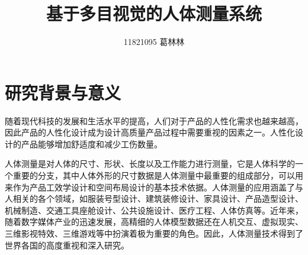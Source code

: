 \documentclass[10pt]{article}
\title{基于多目视觉的人体测量系统}
\author{11821095 葛林林}
\begin{document}
\maketitle


\section{研究背景与意义}
随着现代科技的发展和生活水平的提高，人们对于产品的人性化需求也越来越高，因此产品的人性化设计成为设计高质量产品过程中需要重视的因素之一。人性化设计的产品能够增加舒适度和减少工伤数量。
\par 人体测量是对人体的尺寸、形状、长度以及工作能力进行测量，它是人体科学的一个重要的分支，其中人体外形的尺寸数据是人体测量中最重要的组成部分，可以用来作为产品工效学设计和空间布局设计的基本技术依据。人体测量的应用涵盖了与人相关的各个领域，如服装号型设计、建筑装修设计、家具设计、产品造型设计、机械制造、交通工具座舱设计、公共设施设计、医疗工程、人体仿真等。近年来，随着数字媒体产业的迅速发展，高精细的人体模型数据还在人机交互、虚拟现实、三维影视特效、三维游戏等中扮演着极为重要的角色。因此，人体测量技术得到了世界各国的高度重视和深入研究。
\end{document}
